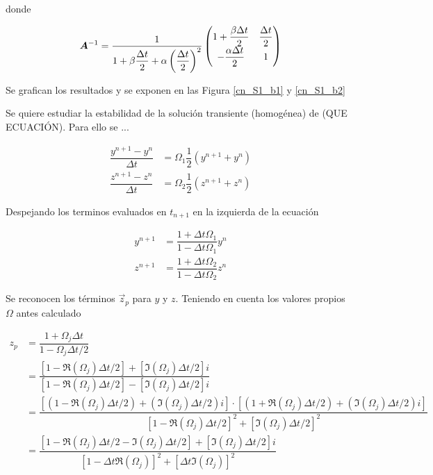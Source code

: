 donde 

\begin{equation}
\boldsymbol{A}^{-1} = \dfrac{1}{1 + \beta \dfrac{\Delta t}{2} + \alpha \left( \dfrac{\Delta t}{2} \right)^2 } 
\begin{pmatrix}
1 + \dfrac{\beta \Delta t}{2} & \dfrac{\Delta t}{2}\\
-\dfrac{\alpha \Delta t}{2} & 1 
\end{pmatrix}
\end{equation}

Se grafican los resultados y se exponen en las Figura \ref{cn_S1_b1} y \ref{cn_S1_b2}

Se quiere estudiar la estabilidad de la solución transiente (homogénea) de (QUE ECUACIÓN). Para ello se ...

\begin{align}
\dfrac{ y^{n+1} - y^n } { \Delta t } & = \Omega_1 \dfrac{1}{2} \left( y^{n+1} + y^{n} \right) \\
\dfrac{ z^{n+1} - z^n } { \Delta t } & = \Omega_2 \dfrac{1}{2} \left( z^{n+1} + z^{n} \right)
\end{align} 

Despejando los terminos evaluados en $t_{n+1}$ en la izquierda de la ecuación

\begin{align}
y^{n+1} &= \dfrac{ 1 + \Delta t \Omega_1 }{ 1 - \Delta t \Omega_1 } y^n \\
z^{n+1} &= \dfrac{ 1 + \Delta t \Omega_2 }{ 1 - \Delta t \Omega_2 } z^n
\end{align}

Se reconocen los términos $\vec{z}_p$ para $y$ y $z$. Teniendo en cuenta los valores propios $\Omega$ antes calculado

\begin{align}
z_p &= \dfrac{1+\Omega_j \Delta t}{1-\Omega_j \Delta t / 2} \\
&= \dfrac{\left[ 1-\Re(\Omega_j) \Delta t / 2 \right] + \left[ \Im(\Omega_j) \Delta t / 2 \right] i}
		 {\left[ 1- \Re(\Omega_j) \Delta t / 2 \right] - \left[ \Im(\Omega_j) \Delta t / 2 \right] i} \\
&= \dfrac{\left[ \left( 1- \Re(\Omega_j) \Delta t / 2 \right) + \left( \Im(\Omega_j) \Delta t / 2 \right) i \right] \cdot \left[ \left( 1+ \Re(\Omega_j) \Delta t / 2 \right) + \left( \Im(\Omega_j) \Delta t / 2 \right) i \right]}
		 {\left[ 1- \Re(\Omega_j) \Delta t / 2 \right]^2 + \left[ \Im(\Omega_j) \Delta t / 2 \right]^2} \\
&= \dfrac{ \left[ 1 - \Re(\Omega_j)\Delta t / 2 - \Im(\Omega_j)\Delta t / 2 \right] + \left[ \Im (\Omega_j) \Delta t / 2 \right] i  } {\left[ 1-\Delta t \Re(\Omega_j) \right]^2 + \left[ \Delta t \Im(\Omega_j) \right]^2}
\end{align}

